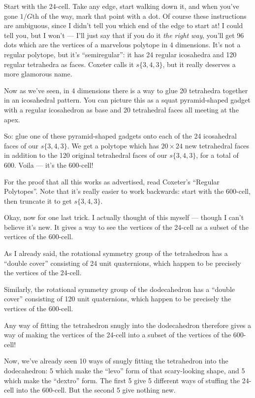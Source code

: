 \documentclass{article}
\begin{document}
Start with the 24-cell. Take any edge, start walking down it, and when
you've gone \(1/G\)th of the way, mark that point with a dot. Of course
these instructions are ambiguous, since I didn't tell you which end of
the edge to start at! I could tell you, but I won't --- I'll just say
that if you do it \emph{the right way}, you'll get 96 dots which are the
vertices of a marvelous polytope in 4 dimensions. It's not a regular
polytope, but it's ``semiregular'': it has 24 regular icosahedra and 120
regular tetrahedra as faces. Coxeter calls it \(s\{3,4,3\}\), but it
really deserves a more glamorous name.

Now as we've seen, in 4 dimensions there is a way to glue 20 tetrahedra
together in an icosahedral pattern. You can picture this as a squat
pyramid-shaped gadget with a regular icosahedron as base and 20
tetrahedral faces all meeting at the apex.

So: glue one of these pyramid-shaped gadgets onto each of the 24
icosahedral faces of our \(s\{3,4,3\}\). We get a polytope which has
\(20\times 24\) new tetrahedral faces in addition to the 120 original
tetrahedral faces of our \(s\{3,4,3\}\), for a total of 600. Voila ---
it's the 600-cell!

For the proof that all this works as advertised, read Coxeter's
``Regular Polytopes''. Note that it's really easier to work backwards:
start with the 600-cell, then truncate it to get \(s\{3,4,3\}\).

Okay, now for one last trick. I actually thought of this myself ---
though I can't believe it's new. It gives a way to see the vertices of
the 24-cell as a subset of the vertices of the 600-cell.

As I already said, the rotational symmetry group of the tetrahedron has
a ``double cover'' consisting of 24 unit quaternions, which happen to be
precisely the vertices of the 24-cell.

Similarly, the rotational symmetry group of the dodecahedron has a
``double cover'' consisting of 120 unit quaternions, which happen to be
precisely the vertices of the 600-cell.

Any way of fitting the tetrahedron snugly into the dodecahedron
therefore gives a way of making the vertices of the 24-cell into a
subset of the vertices of the 600-cell!

Now, we've already seen 10 ways of snugly fitting the tetrahedron into
the dodecahedron: 5 which make the ``levo'' form of that scary-looking
shape, and 5 which make the ``dextro'' form. The first 5 give 5
different ways of stuffing the 24-cell into the 600-cell. But the second
5 give nothing new.
\end{document}

